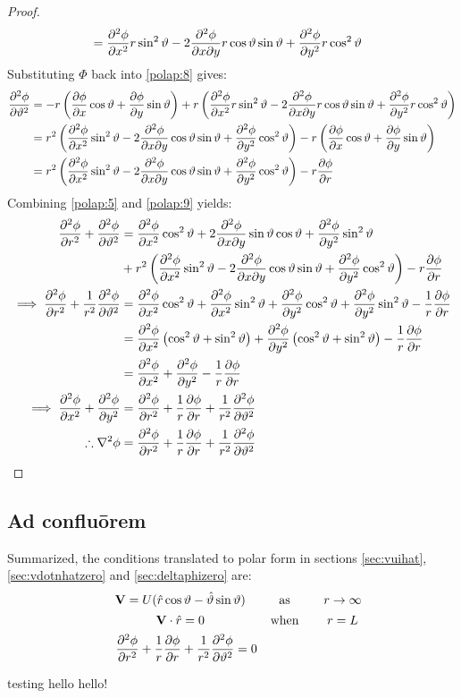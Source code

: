 \begin{proof}
\begin{align}
		\notag&=\pdv[2]{\phi}{x}r\sin^2\vartheta-2\pdv{\phi}{x}{y}r\cos\vartheta\sin\vartheta+\pdv[2]{\phi}{y}r\cos^2\vartheta
	\end{align}
	Substituting $\Phi$ back into \ref{polap:8} gives:
	\begin{align}
		\notag\pdv[2]{\phi}{\vartheta}&=-r\left(\pdv{\phi}{x}\cos\vartheta+\pdv{\phi}{y}\sin\vartheta\right)+r\left(\pdv[2]{\phi}{x}r\sin^2\vartheta-2\pdv{\phi}{x}{y}r\cos\vartheta\sin\vartheta+\pdv[2]{\phi}{y}r\cos^2\vartheta\right)\\
		\notag&=r^2\left(\pdv[2]{\phi}{x}\sin^2\vartheta-2\pdv{\phi}{x}{y}\cos\vartheta\sin\vartheta+\pdv[2]{\phi}{y}\cos^2\vartheta\right)-r\left(\pdv{\phi}{x}\cos\vartheta+\pdv{\phi}{y}\sin\vartheta\right)\\
		\label{polap:9}&=r^2\left(\pdv[2]{\phi}{x}\sin^2\vartheta-2\pdv{\phi}{x}{y}\cos\vartheta\sin\vartheta+\pdv[2]{\phi}{y}\cos^2\vartheta\right)-r\pdv{\phi}{r}
	\end{align}
	Combining \ref{polap:5} and \ref{polap:9} yields:
	\begin{align}
		\notag\pdv[2]{\phi}{r}+\pdv[2]{\phi}{\theta}&=\pdv[2]{\phi}{x}\cos^2\theta+2\pdv{\phi}{x}{y}\sin\theta\cos\theta+\pdv[2]{\phi}{y}\sin^2\theta\\
		\notag&+r^2\left(\pdv[2]{\phi}{x}\sin^2\theta-2\pdv{\phi}{x}{y}\cos\theta\sin\theta+\pdv[2]{\phi}{y}\cos^2\theta\right)-r\pdv{\phi}{r}\\
		\notag\implies\notag\pdv[2]{\phi}{r}+\frac{1}{r^2}\pdv[2]{\phi}{\theta}&=\pdv[2]{\phi}{x}\cos^2\theta+\pdv[2]{\phi}{x}\sin^2\theta+\pdv[2]{\phi}{y}\cos^2\theta+\pdv[2]{\phi}{y}\sin^2\theta-\frac{1}{r}\pdv{\phi}{r}\\
		\notag&=\pdv[2]{\phi}{x}\left(\cos^2\theta+\sin^2\theta\right)+\pdv[2]{\phi}{y}\left(\cos^2\theta+\sin^2\theta\right)-\frac{1}{r}\pdv{\phi}{r}\\
		\notag&=\pdv[2]{\phi}{x}+\pdv[2]{\phi}{y}-\frac{1}{r}\pdv{\phi}{r}\\
		\notag\implies\pdv[2]{\phi}{x}+\pdv[2]{\phi}{y}&=\pdv[2]{\phi}{r}+\frac{1}{r}\pdv{\phi}{r}+\frac{1}{r^2}\pdv[2]{\phi}{\theta}\\
		\label{polap:final}\therefore\laplacian{\phi}&=\pdv[2]{\phi}{r}+\frac{1}{r}\pdv{\phi}{r}+\frac{1}{r^2}\pdv[2]{\phi}{\theta}
	\end{align}	
\end{proof}

\subsection{Ad confluōrem}
Summarized, the conditions translated to polar form in sections \ref{sec:vuihat}, \ref{sec:vdotnhatzero} and \ref{sec:deltaphizero} are:
$$\begin{matrix}
	&\mathbf{V}=U(\rhat\cos\theta-\thetahat\sin\theta)\quad&\text{as}\quad&r\rightarrow\infty\vecpadding\\
	&\mathbf{V}\cdot\rhat=0\quad&\text{when}\quad&r=L\vecpadding\\
	&\dfrac{\partial^2\phi}{\partial r^2}+\dfrac{1}{r}\dfrac{\partial\phi}{\partial r}+\dfrac{1}{r^2}\dfrac{\partial^2\phi}{\partial\theta^2}=0
\end{matrix}$$

testing hello hello!\cite{mat132-episode25}